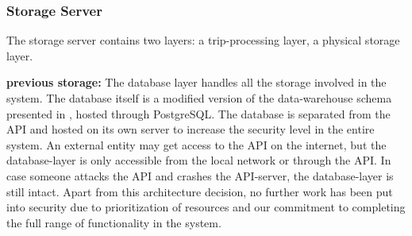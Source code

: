 \subsubsection{Storage Server}\label{subsec:storageserver}
The storage server contains two layers: a trip-processing layer, a physical storage layer.

\textbf{previous storage:}
The database layer handles all the storage involved in the system. The database itself is a modified version of the data-warehouse schema presented in \cite{sw9_report}, hosted through PostgreSQL\cite{postgresql}. The database is separated from the API and hosted on its own server to increase the security level in the entire system. An external entity may get access to the API on the internet, but the database-layer is only accessible from the local network or through the API. In case someone attacks the API and crashes the API-server, the database-layer is still intact. Apart from this architecture decision, no further work has been put into security due to prioritization of resources and our commitment to completing the full range of functionality in the system. 